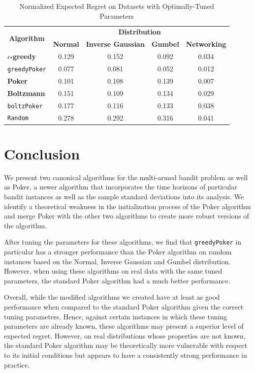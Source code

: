\documentclass[12pt]{article}
\begin{document}
\begin{table}[htbp]
  \centering
  \caption{Normalized Expected Regret on Datasets with Optimally-Tuned Parameters}
    \begin{tabular}{|c|c|c|c|c|}
    \hline
    \multicolumn{1}{|c|}{\multirow{2}[5]{*}{\textbf{Algorithm}}} & \multicolumn{4}{|c|}{\textbf{Distribution}} \\ \cline{2-5}
    \multicolumn{1}{|c|}{} & \multicolumn{1}{|c|}{\textbf{Normal}} & \multicolumn{1}{|c|}{\textbf{Inverse Gaussian}} & \multicolumn{1}{|c|}{\textbf{Gumbel}} & \multicolumn{1}{|c|}{\textbf{Networking}} \\ \hline
    \multicolumn{1}{|l|}{\textbf{$\epsilon$-greedy}} & 0.129 & 0.152 & 0.092 & 0.034 \\  \hline
    \multicolumn{1}{|l|}{\texttt{greedyPoker}} & 0.077 & 0.081 & 0.052 & 0.012   \\ \hline
    \multicolumn{1}{|l|}{\textbf{Poker}} & 0.101 & 0.108 & 0.139  & 0.007\\ \hline
    \multicolumn{1}{|l|}{\textbf{Boltzmann}} & 0.151 & 0.109 & 0.134 & 0.029  \\ \hline
    \multicolumn{1}{|l|}{\texttt{boltzPoker}} & 0.177 & 0.116 & 0.133  & 0.038 \\ \hline
    \multicolumn{1}{|l|}{\texttt{Random}} & 0.278 & 0.292 & 0.316 & 0.041  \\ \hline
    \end{tabular}%
  \label{tab:tuned_results}%
\end{table}%


\section{Conclusion}

We present two canonical algorithms for the multi-armed bandit problem as well as Poker, a newer algorithm that incorporates the time horizons of particular bandit instances as well as the sample standard deviations into its analysis. We identify a theoretical weakness in the initialization process of the Poker algorithm and merge Poker with the other two algorithms to create more robust versions of the algorithm.

After tuning the parameters for these algorithms, we find that \texttt{greedyPoker} in particular has a stronger performance than the Poker algorithm on random instances based on the Normal, Inverse Gaussian and Gumbel distribution. However, when using these algorithms on real data with the same tuned parameters, the standard Poker algorithm had a much better performance.

Overall, while the modified algorithms we created have at least as good performance when compared to the standard Poker algorithm given the correct tuning parameters. Hence, against certain instances in which these tuning parameters are already known, these algorithms may present a superior level of expected regret. However, on real distributions whose properties are not known, the standard Poker algorithm may be theoretically more vulnerable with respect to its initial conditions but appears to have a consistently strong performance in practice.



\end{document}
